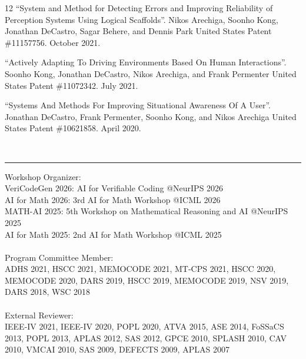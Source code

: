 \documentclass[10pt, letterpaper]{article}
\newcommand{\interval}[2]
{#1 -- \makebox[1.5cm]{\hfill#2}}
\newcommand{\amper}{{\fontspec[Scale=.95]{Adobe Caslon Pro}\selectfont\itshape\&}\xspace}
\newcommand{\mysection}[1]{
  \vspace{20pt}\noindent{\rmfamily\mdseries \Large #1}\\
  \vspace{-6pt}\hrule\vspace{3pt}
}
\begin{document}
\begin{thebibliography}{12}
``System and Method for Detecting Errors and Improving Reliability of Perception Systems Using Logical Scaffolds''.
Nikos Arechiga, Soonho Kong, Jonathan DeCastro, Sagar Behere, and Dennis Park
United States Patent \#11157756. October 2021.

``Actively Adapting To Driving Environments Based On Human Interactions''.
Soonho Kong, Jonathan DeCastro, Nikos Arechiga, and Frank Permenter
United States Patent \#11072342. July 2021.

 ``Systems And Methods For Improving Situational Awareness Of A User''.
Jonathan DeCastro, Frank Permenter, Soonho Kong, and Nikos Arechiga
United States Patent \#10621858. April 2020.

\end{thebibliography}





\newpage
\mysection{Professional Activities}
Workshop Organizer:\\
VeriCodeGen 2026: AI for Verifiable Coding @NeurIPS 2026\\
AI for Math 2026: 3rd AI for Math Workshop @ICML 2026\\
MATH-AI 2025: 5th Workshop on Mathematical Reasoning and AI @NeurIPS 2025\\
AI for Math 2025: 2nd AI for Math Workshop @ICML 2025
\\\\
Program Committee Member:\\
 ADHS 2021,
 HSCC 2021,
 MEMOCODE 2021,
 MT-CPS 2021,
 HSCC 2020,
 MEMOCODE 2020,
 DARS 2019,
 HSCC 2019,
 MEMOCODE 2019,
 NSV 2019,
 DARS 2018,
 WSC 2018
\\\\
External Reviewer:\\
IEEE-IV 2021, IEEE-IV 2020, POPL 2020, ATVA 2015, ASE 2014, FoSSaCS 2013, POPL 2013, APLAS 2012, SAS 2012,
GPCE 2010, SPLASH 2010, CAV 2010, VMCAI 2010, SAS 2009, DEFECTS 2009, APLAS 2007
\end{document}
